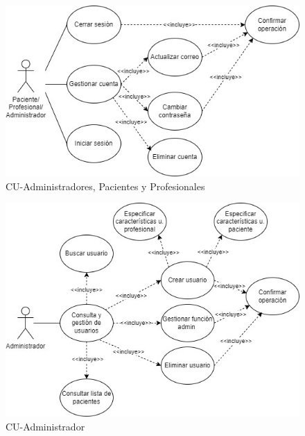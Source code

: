 \begin{figure}[h]
    \centering
    \includegraphics[width=1\textwidth]{img/CUdiagramas/CU-todos.jpg}
    \caption{CU-Administradores, Pacientes y Profesionales}
    \label{fig:CU-todos}
\end{figure}

\begin{figure}[h]
    \centering
    \includegraphics[width=1\textwidth]{img/CUdiagramas/CU-Administrador.jpg}
    \caption{CU-Administrador}
    \label{fig:CU-Administrador}
\end{figure}

